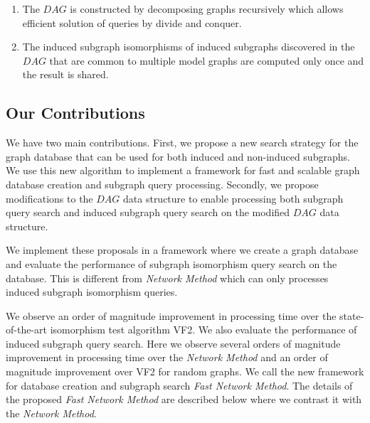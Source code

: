 \begin{enumerate}
\item The $DAG$ is constructed by decomposing graphs recursively which allows efficient solution of queries by divide and conquer.
\item The induced subgraph isomorphisms of induced subgraphs discovered in the $DAG$ that are common to multiple model graphs are computed only once and the result is shared.
\end{enumerate}

\subsection{Our Contributions}
We have two main contributions. 
First, we propose a new search strategy for the graph database that can be used for both induced and non-induced subgraphs. 
We use this new algorithm to implement a framework for fast and scalable graph database creation and subgraph query processing. 
Secondly, we propose modifications to the $DAG$ data structure to enable processing both subgraph query search and induced subgraph query search on the modified $DAG$ data structure. 


We implement these proposals in a framework where we create a graph database and evaluate the performance of subgraph isomorphism query search on the database. This is different from \textit{Network Method} which can only processes induced subgraph isomorphism queries. 


We observe an order of magnitude improvement in processing time over the state-of-the-art isomorphism test algorithm VF2.  
We also evaluate the performance of induced subgraph query search. Here we observe several orders of magnitude improvement in processing time over the \textit{Network Method} and an order of magnitude improvement over VF2 for random graphs. 
We call the new framework for database creation and subgraph search \textit{Fast Network Method}. 
The details of the proposed \textit{Fast Network Method} are described below where we contrast it with the \textit{Network Method}.





